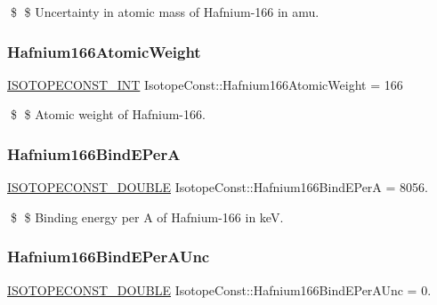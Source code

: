 \$ \$ Uncertainty in atomic mass of Hafnium-\/166 in amu. \mbox{\label{group___isotope_const-_hafnium-_hf166_gab4f9c31e8c7b7647ad5155c0b330e7c9}} 
\subsubsection{\texorpdfstring{Hafnium166\+Atomic\+Weight}{Hafnium166AtomicWeight}}
{\footnotesize\ttfamily \mbox{\hyperlink{group___isotope_const-_macros_ga5f18360b3e99483a35c32d789e62621c}{I\+S\+O\+T\+O\+P\+E\+C\+O\+N\+S\+T\+\_\+\+I\+NT}} Isotope\+Const\+::\+Hafnium166\+Atomic\+Weight = 166}

\$ \$ Atomic weight of Hafnium-\/166. \mbox{\label{group___isotope_const-_hafnium-_hf166_ga7a6bd4b231fe3b488c8b034462685ee7}} 
\subsubsection{\texorpdfstring{Hafnium166\+Bind\+E\+PerA}{Hafnium166BindEPerA}}
{\footnotesize\ttfamily \mbox{\hyperlink{group___isotope_const-_macros_ga8f45a7272ce02c0b4c65c44636ed719a}{I\+S\+O\+T\+O\+P\+E\+C\+O\+N\+S\+T\+\_\+\+D\+O\+U\+B\+LE}} Isotope\+Const\+::\+Hafnium166\+Bind\+E\+PerA = 8056.}

\$ \$ Binding energy per A of Hafnium-\/166 in keV. \mbox{\label{group___isotope_const-_hafnium-_hf166_ga5d70679a1e8515ae2b9719216d6d1836}} 
\subsubsection{\texorpdfstring{Hafnium166\+Bind\+E\+Per\+A\+Unc}{Hafnium166BindEPerAUnc}}
{\footnotesize\ttfamily \mbox{\hyperlink{group___isotope_const-_macros_ga8f45a7272ce02c0b4c65c44636ed719a}{I\+S\+O\+T\+O\+P\+E\+C\+O\+N\+S\+T\+\_\+\+D\+O\+U\+B\+LE}} Isotope\+Const\+::\+Hafnium166\+Bind\+E\+Per\+A\+Unc = 0.}

